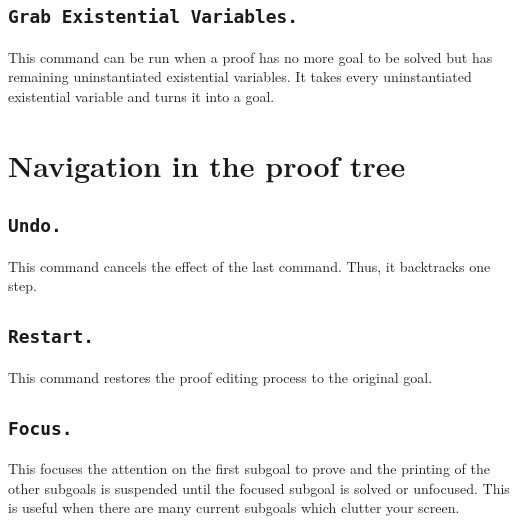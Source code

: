 \subsection[\tt Grab Existential Variables.]{\tt Grab Existential Variables.
\label{GrabEvars}}

This command can be run when a proof has no more goal to be solved but has remaining
uninstantiated existential variables. It takes every uninstantiated existential variable
and turns it into a goal.

\section{Navigation in the proof tree}

\subsection[\tt Undo.]{\tt Undo.}

This command cancels the effect of the last command.  Thus, it
backtracks one step.


\subsection[\tt Restart.]{\tt Restart.}
This command restores the proof editing process to the original goal.

\begin{ErrMsgs}
\item {}
\end{ErrMsgs}

\subsection[\tt Focus.]{\tt Focus.}
This focuses the attention on the first subgoal to prove and the printing
of the other subgoals is suspended until the focused subgoal is
solved or unfocused. This is useful when there are many current
subgoals which clutter your screen.

